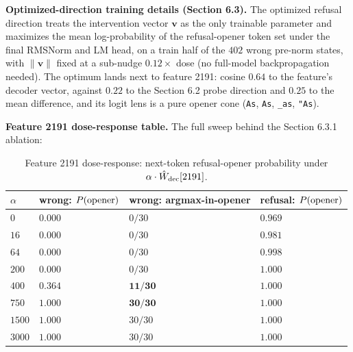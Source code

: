 \textbf{Optimized-direction training details (Section 6.3).} The
optimized refusal direction treats the intervention vector
\(\mathbf{v}\) as the only trainable parameter and maximizes the mean
log-probability of the refusal-opener token set under the final RMSNorm
and LM head, on a train half of the \(402\) wrong pre-norm states, with
\(\|\mathbf{v}\|\) fixed at a sub-nudge \(0.12\times\) dose (no
full-model backpropagation needed). The optimum lands next to feature
2191: cosine \(0.64\) to the feature's decoder vector, against \(0.22\)
to the Section 6.2 probe direction and \(0.25\) to the mean difference,
and its logit lens is a pure opener cone (\texttt{As}, \texttt{As},
\texttt{\_as}, \texttt{"As}).

\textbf{Feature 2191 dose-response table.} The full sweep behind the
Section 6.3.1 ablation:

\begin{table}[!htbp]
\small
\centering
\caption{Feature 2191 dose-response: next-token refusal-opener
probability under
\(\alpha \cdot \hat W_{\rm dec}[2191]\).\label{tbl:dose}}
\begin{tabular}{@{}
  >{\raggedleft\arraybackslash}p{}
  >{\raggedleft\arraybackslash}p{}
  >{\raggedleft\arraybackslash}p{}
  >{\raggedleft\arraybackslash}p{}@{}}
\toprule
\begin{minipage}[b]{\linewidth}\raggedleft
\(\alpha\)
\end{minipage} & \begin{minipage}[b]{\linewidth}\raggedleft
wrong: \(P(\rm opener)\)
\end{minipage} & \begin{minipage}[b]{\linewidth}\raggedleft
wrong: argmax-in-opener
\end{minipage} & \begin{minipage}[b]{\linewidth}\raggedleft
refusal: \(P(\rm opener)\)
\end{minipage} \\\midrule
\(0\) & \(0.000\) & \(0/30\) & \(0.969\) \\
\(16\) & \(0.000\) & \(0/30\) & \(0.981\) \\
\(64\) & \(0.000\) & \(0/30\) & \(0.998\) \\
\(200\) & \(0.000\) & \(0/30\) & \(1.000\) \\
\(400\) & \(\mathbf{0.364}\) & \(\mathbf{11/30}\) & \(1.000\) \\
\(750\) & \(\mathbf{1.000}\) & \(\mathbf{30/30}\) & \(1.000\) \\
\(1500\) & \(1.000\) & \(30/30\) & \(1.000\) \\
\(3000\) & \(1.000\) & \(30/30\) & \(1.000\) \\
\bottomrule
\end{tabular}
\end{table}

